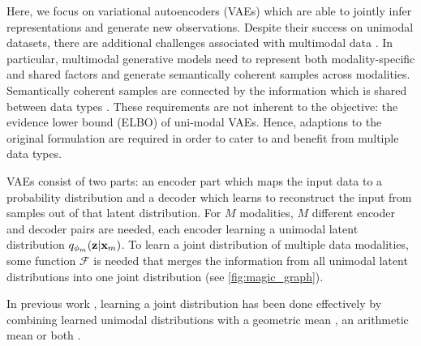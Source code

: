 Here, we focus on variational autoencoders (VAEs) \parencite{kingma_auto-encoding_2014,rezende_stochastic_2014} which are able to jointly infer representations and generate new observations.
Despite their success on unimodal datasets, there are additional challenges associated with multimodal data \parencite{suzuki_joint_2016, vedantam_generative_2018}.
In particular, multimodal generative models need to represent both modality-specific and shared factors and generate semantically coherent samples across modalities.
Semantically coherent samples are connected by the information which is shared between data types \parencite{shi_variational_2019}.
These requirements are not inherent to the objective: the evidence lower bound (ELBO) of uni-modal VAEs.
Hence, adaptions to the original formulation are required in order to cater to and benefit from multiple data types.





VAEs consist of two parts: an encoder part which maps the input data to a probability distribution and a decoder which learns to reconstruct the input from samples out of that latent distribution.
For $M$ modalities, $M$ different encoder and decoder pairs are needed, each encoder learning a unimodal latent distribution $q_{\phi_m}(\textbf{z}|\textbf{x}_m)$.
To learn a joint distribution of multiple data modalities, some function $\mathcal{F}$ is needed that merges the information from all unimodal latent distributions into one joint distribution (see \cref{fig:magic_graph}).


In previous work \parencite{poe,shi_variational_2019,sutter_generalized_2020}, learning a joint distribution has been done effectively by combining learned unimodal distributions with a geometric mean \parencite{poe}, an arithmetic mean \parencite{shi_variational_2019} or both \parencite{sutter_generalized_2020}.


